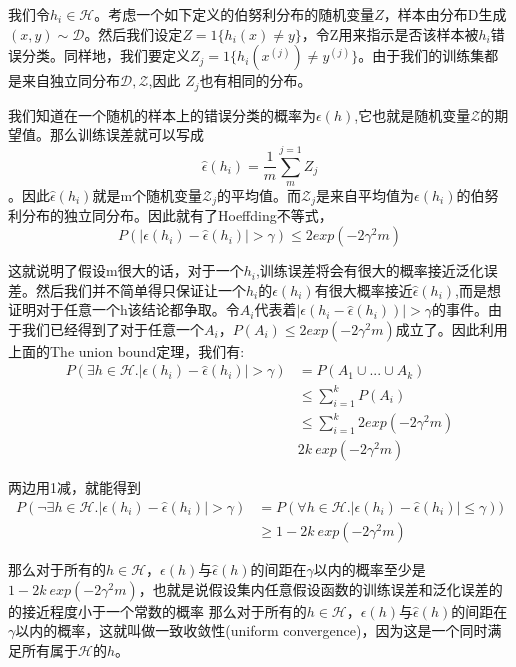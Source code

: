 \documentclass[UTF8]{ctexart}
\begin{document}
我们令$h_{i} \in \mathcal{H}$。考虑一个如下定义的伯努利分布的随机变量$Z$，样本由分布D生成$(x,y)\sim \mathcal{D}$。然后我们设定$Z = 1 \{ h_{i}(x) \neq y\}$，令Z用来指示是否该样本被$h_{i}$错误分类。同样地，我们要定义$Z_{j}=1\{ h_{i}(x^{(j)})\neq y^{(j)}\}$。由于我们的训练集都是来自独立同分布$\mathcal{D},\mathcal{Z}$,因此
$Z_{j}$也有相同的分布。

我们知道在一个随机的样本上的错误分类的概率为$\epsilon(h)$,它也就是随机变量$\mathcal{Z}$的期望值。那么训练误差就可以写成\[ \hat{\epsilon}(h_{i}) = \frac{1}{m} \sum_{m}^{j=1} Z_{j}\]。因此$\hat{\epsilon}(h_{i})$就是m个随机变量$\mathcal{Z}_{j}$的平均值。而$\mathcal{Z}_{j}$是来自平均值为$\epsilon(h_{i})$的伯努利分布的独立同分布。因此就有了Hoeffding不等式，\[ P(|\epsilon(h_{i})-\hat{\epsilon}(h_{i})|>\gamma )\leq 2 exp(-2\gamma^{2}m)\]

这就说明了假设m很大的话，对于一个$h_{i}$,训练误差将会有很大的概率接近泛化误差。然后我们并不简单得只保证让一个$h_{i}$的$\epsilon(h_{i})$有很大概率接近$\hat{\epsilon}(h_{i})$,而是想证明对于任意一个h该结论都争取。令$A_{i}$代表着$|\epsilon(h_{i}-\hat{\epsilon}(h_{i}))|>\gamma$的事件。由于我们已经得到了对于任意一个$A_{i}$，$P(A_{i})\leq 2 exp(-2\gamma^{2}m)$成立了。因此利用上面的The union bound定理，我们有:
\begin{align*}
P(\exists h \in \mathcal{H}. |\epsilon(h_{i})-\hat{\epsilon}(h_{i})|>\gamma ) &=  P(A_{1} \cup ... \cup A_{k}) \\
&  \leq \sum_{i=1}^{k}P(A_{i}) \\
&  \leq \sum_{i=1}^{k}2exp(-2\gamma^{2}m) \\
&  2k\ exp(-2\gamma^{2}m)
\end{align*}

两边用1减，就能得到
\begin{align*}
P(\neg \exists h \in \mathcal{H}. |\epsilon(h_{i})-\hat{\epsilon}(h_{i})|>\gamma ) &=  P(\forall h \in \mathcal{H}. |\epsilon(h_{i})-\hat{\epsilon}(h_{i})|\leq \gamma ) ) \\
&\geq 1-2k\ exp(-2\gamma^{2}m)
\end{align*}


那么对于所有的$h\in \mathcal{H}$，$\epsilon(h)$与$\hat{\epsilon}(h)$的间距在$ \gamma$以内的概率至少是 $1-2k\ exp(-2\gamma^{2}m)$，也就是说假设集内任意假设函数的训练误差和泛化误差的的接近程度小于一个常数的概率
那么对于所有的$h\in \mathcal{H}$，$\epsilon(h)$与$\hat{\epsilon}(h)$的间距在$ \gamma$以内的概率，这就叫做一致收敛性(uniform convergence)，因为这是一个同时满足所有属于$\mathcal{H}$的$h$。
\end{document}
